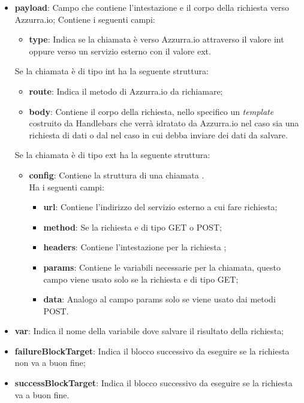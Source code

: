 \begin{itemize}
	\item \textbf{payload}: Campo che contiene l'intestazione e il corpo della richiesta verso Azzurra.io;
	Contiene i seguenti campi:
	\begin{itemize}
		\item \textbf{type}: Indica se la chiamata è verso Azzurra.io attraverso il valore \textsf{int} oppure verso un servizio esterno con il valore \textsf{ext}.
	\end{itemize}
	Se la chiamata è di tipo int ha la seguente struttura:
	\begin{itemize}
		\item \textbf{route}: Indica il metodo di Azzurra.io da richiamare;
		\item \textbf{body}: Contiene il corpo della richiesta, nello specifico un \emph{template} costruito da Handlebars che verrà idratato da Azzurra.io nel caso sia una richiesta di dati o dal  nel caso in cui debba inviare dei dati da salvare.
	\end{itemize}
	Se la chiamata è di tipo ext ha la seguente struttura:
	\begin{itemize}
		\item \textbf{config}: Contiene la struttura di una chiamata .\\
		Ha i seguenti campi:
		\begin{itemize}
			\item \textbf{url}: Contiene l'indirizzo  del servizio esterno a cui fare richiesta;
			\item \textbf{method}: Se la richiesta e di tipo GET o POST;
			\item \textbf{headers}: Contiene l'intestazione per la richiesta ;
			\item \textbf{params}: Contiene le variabili necessarie per la chiamata, questo campo viene usato solo se la richiesta e di tipo GET;
			\item \textbf{data}: Analogo al campo params solo se viene usato dai metodi POST.
		\end{itemize}
	\end{itemize}
	\item \textbf{var}: Indica il nome della variabile dove salvare il risultato della richiesta;
	\item \textbf{failureBlockTarget}: Indica il blocco successivo da eseguire se la richiesta non va a buon fine;
	\item \textbf{successBlockTarget}: Indica il blocco successivo da eseguire se la richiesta va a buon fine.
\end{itemize}

